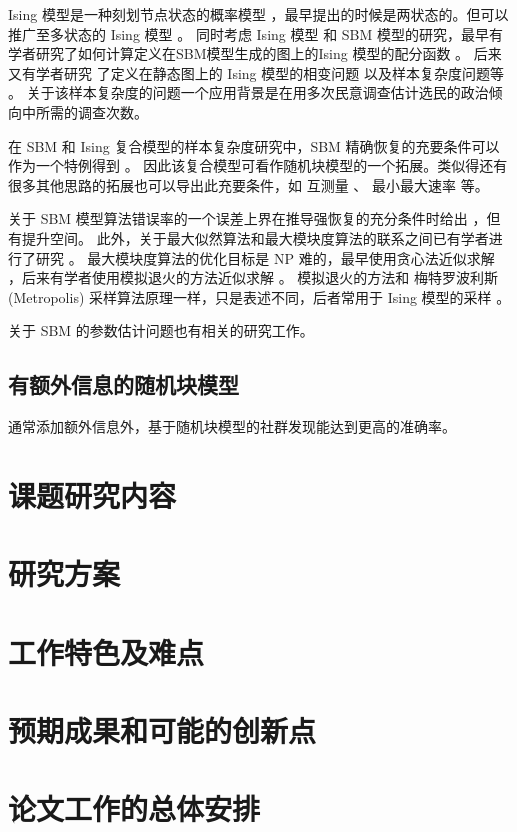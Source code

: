 \documentclass{ctexart}
\begin{document}
Ising 模型是一种刻划节点状态的概率模型 \cite{ising1925beitrag}，最早提出的时候是两状态的。但可以推广至多状态的 Ising 模型 \cite{potts1952some}。
同时考虑 Ising 模型 和 SBM 模型的研究，最早有学者研究了如何计算定义在SBM模型生成的图上的Ising 模型的配分函数 \cite{liu2017log}。
后来又有学者研究 了定义在静态图上的 Ising 模型的相变问题 \cite{berthet2019exact} 以及样本复杂度问题等 \cite{ye2020exact}。
关于该样本复杂度的问题一个应用背景是在用多次民意调查估计选民的政治倾向中所需的调查次数。

在 SBM 和 Ising 复合模型的样本复杂度研究中，SBM 精确恢复的充要条件可以作为一个特例得到 \cite{ye2020exact}。
因此该复合模型可看作随机块模型的一个拓展。类似得还有很多其他思路的拓展也可以导出此充要条件，如 互测量 \cite{chen2016information}、 最小最大速率 \cite{zhang2016} 等。

关于 SBM 模型算法错误率的一个误差上界在推导强恢复的充分条件时给出 \cite{abbe2015exact}，但有提升空间。
此外，关于最大似然算法和最大模块度算法的联系之间已有学者进行了研究 \cite{newman2016equivalence}。
最大模块度算法的优化目标是 NP 难的，最早使用贪心法近似求解 \cite{clauset2004finding}，后来有学者使用模拟退火的方法近似求解 \cite{he2016fast}。
模拟退火的方法和 梅特罗波利斯 (Metropolis) 采样算法原理一样，只是表述不同，后者常用于 Ising 模型的采样 \cite{metropolis1953equation}。

关于 SBM 的参数估计问题也有相关的研究工作。
\subsection{有额外信息的随机块模型}
通常添加额外信息外，基于随机块模型的社群发现能达到更高的准确率。
\section{课题研究内容}
\section{研究方案}
\section{工作特色及难点}
\section{预期成果和可能的创新点}
\section{论文工作的总体安排}



\end{document}
